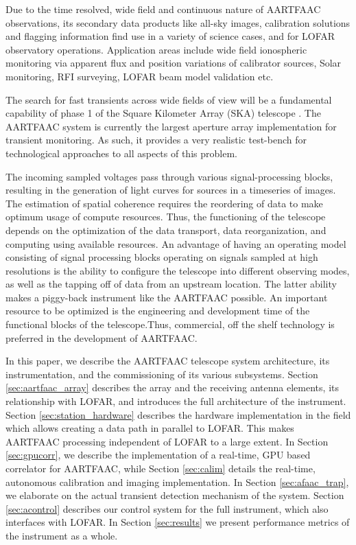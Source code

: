 \documentclass{ws-jai}
\begin{document}
Due  to  the  time  resolved,  wide field  and  continuous  nature  of  AARTFAAC
observations,  its  secondary data  products  like  all-sky images,  calibration
solutions and flagging  information find use in a variety  of science cases, and
for  LOFAR  observatory  operations.    Application  areas  include  wide  field
ionospheric monitoring via  apparent flux and position  variations of calibrator
sources, Solar monitoring, RFI surveying, LOFAR beam model validation etc.

The search for fast transients across wide  fields of view will be a fundamental
capability  of   phase  1  of   the  Square  Kilometer  Array   (SKA)  telescope
\cite{colegate2011searching}.   The AARTFAAC  system  is  currently the  largest
aperture array implementation  for transient monitoring. As such,  it provides a
very realistic  test-bench for  technological approaches to  all aspects  of this
problem.

The  incoming sampled  voltages pass  through various  signal-processing blocks,
resulting  in the  generation of  light curves  for sources  in a  timeseries of
images.  The estimation of spatial coherence  requires the reordering of data to
make optimum usage of compute resources.  Thus, the functioning of the telescope
depends  on the  optimization of  the data  transport, data  reorganization, and
computing using available resources.  An  advantage of having an operating model
consisting  of signal  processing blocks  operating on  signals sampled  at high
resolutions is the  ability to configure the telescope  into different observing
modes, as well as the tapping off of data from an upstream location.  The latter
ability makes a piggy-back instrument  like the AARTFAAC possible.  An important
resource  to  be optimized  is  the  engineering  and  development time  of  the
functional blocks of the telescope.Thus, commercial, off the shelf technology is
preferred in the development of AARTFAAC.

In  this paper,  we describe  the  AARTFAAC telescope  system architecture,  its
instrumentation,  and  the commissioning  of  its  various subsystems.   Section
\ref{sec:aartfaac_array} describes the array and the receiving antenna elements,
its  relationship  with LOFAR,  and  introduces  the  full architecture  of  the
instrument.    Section   \ref{sec:station_hardware}   describes   the   hardware
implementation in  the field which  allows creating a  data path in  parallel to
LOFAR. This  makes AARTFAAC processing independent  of LOFAR to a  large extent.
In Section \ref{sec:gpucorr}, we describe the implementation of a real-time, GPU
based  correlator  for  AARTFAAC,  while  Section  \ref{sec:calim}  details  the
real-time,  autonomous  calibration  and   imaging  implementation.  In  Section
\ref{sec:afaac_trap}, we  elaborate on the actual  transient detection mechanism
of the system.  Section \ref{sec:acontrol}  describes our control system for the
full instrument, which also interfaces with LOFAR.  In Section \ref{sec:results}
we present performance metrics of the instrument as a whole.
\end{document}
